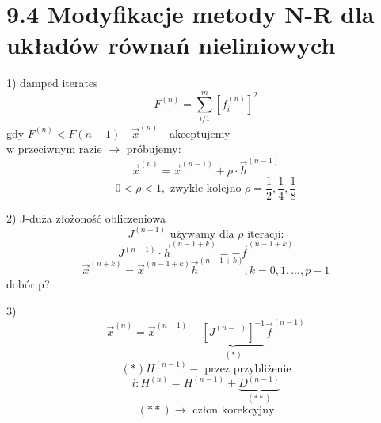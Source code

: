 \section{9.4 Modyfikacje metody N-R dla układów równań nieliniowych}

\begin{frame}{}
  \begin{block}{1) damped iterates}
    $$F^{(n)}=\sum_{i/1}^{m} [f_i^{(n)}]^2$$
    gdy $F^{(n)}<F{(n-1)}\quad\overrightarrow{x}^{(n)}$ - akceptujemy\\
    w przeciwnym razie $\rightarrow$ próbujemy:
    $$\overrightarrow{x}^{(n)}=\overrightarrow{x}^{(n-1)}+\rho \cdot \overrightarrow{h}^{(n-1)}$$
    $$0<\rho<1,\text{ zwykle kolejno } \rho=\frac{1}{2},\frac{1}{4},\frac{1}{8}$$
  \end{block}
\end{frame}

\begin{frame}{}
  \begin{block}{2)}
    J-duża złożoność obliczeniowa
    $$J^{(n-1)}\text{ używamy dla }\rho\text{ iteracji:}$$
    $$J^{(n-1)} \cdot \overrightarrow{h}^{(n-1+k)}=-\overrightarrow{f}^{(n-1+k)}$$
    $$\overrightarrow{x}^{(n+k)}=\overrightarrow{x}^{(n-1+k)}\overrightarrow{h}^{(n-1+k)}, k=0,1,...,p-1$$
    dobór p?
  \end{block}
\end{frame}

\begin{frame}{}
  \begin{block}{3)}
    $$\overrightarrow{x}^{(n)}=\overrightarrow{x}^{(n-1)}-\underbrace{[J^{(n-1)}]^{-1}}_{(*)}\overrightarrow{f}^{(n-1)}$$
    $$(*)H^{(n-1)}-\text{ przez przybliżenie}$$
    $${i:H^{(n)}=H^{(n-1)}+\underbrace{D^{(n-1)}}_{(**)}}$$
    $$(**)\rightarrow\text{ człon korekcyjny}$$
  \end{block}
\end{frame}